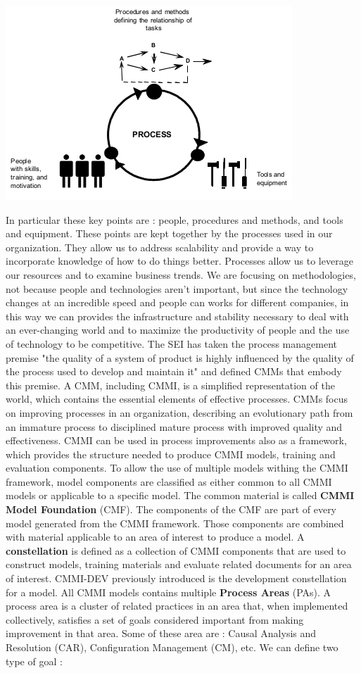 \documentclass[11pt]{article}
\begin{document}
\begin{center}
\includegraphics[scale=0.40]{./images/SEI_key_points.png}
\end{center}
In particular these key points are : people, procedures and methods, and tools and equipment. These points are kept together by the processes used in our organization. They allow us to address scalability and provide a way to incorporate knowledge of how to do things better. Processes allow us to leverage our resources and to examine business trends. We are focusing on methodologies, not because people and technologies aren't important, but since the technology changes at an incredible speed and people can works for different companies, in this way we can provides the infrastructure and stability necessary to deal with an ever-changing world and to maximize the productivity of people and the use of technology to be competitive. The SEI has taken the process management premise "the quality of a system of product is highly influenced by the quality of the process used to develop and maintain it" and defined CMMs that embody this premise. A CMM, including CMMI, is a simplified representation of the world, which contains the essential elements of effective processes. CMMs focus on improving processes in an organization, describing an evolutionary path from an immature process to disciplined mature process with improved quality and effectiveness. CMMI can be used in process improvements also as a framework, which provides the structure needed to produce CMMI models, training and evaluation components. To allow the use of multiple models withing the CMMI framework, model components are classified as either common to all CMMI models or applicable to a specific model. The common material is called \textbf{CMMI Model Foundation} (CMF). The components of the CMF are part of every model generated from the CMMI framework. Those components are combined with material applicable to an area of interest to produce a model. A \textbf{constellation} is defined as a collection of CMMI components that are used to construct models, training materials and evaluate related documents for an area of interest. CMMI-DEV previously introduced is the development constellation for a model. All CMMI models contains multiple \textbf{Process Areas} (PAs). A process area is a cluster of related practices in an area that, when implemented collectively, satisfies a set of goals considered important from making improvement in that area. Some of these area are : Causal Analysis and Resolution (CAR), Configuration Management (CM), etc. We can define two type of goal :
\end{document}
